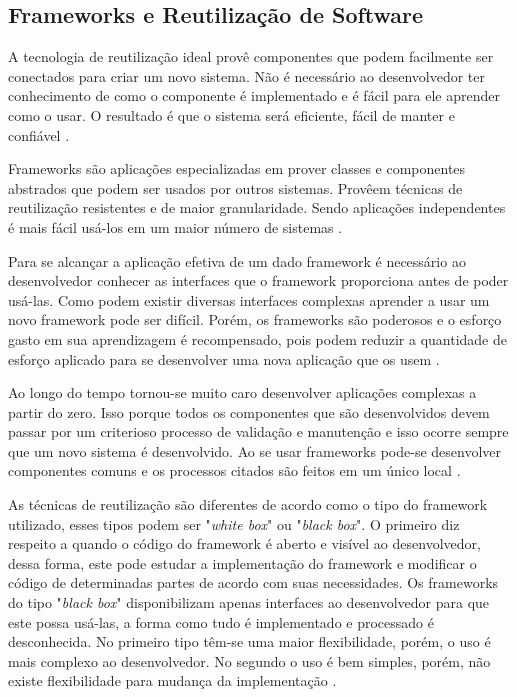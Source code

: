 \subsection{Frameworks e Reutilização de Software}

A tecnologia de reutilização ideal provê componentes que podem facilmente ser conectados para criar um novo sistema. Não é necessário ao desenvolvedor ter conhecimento de como o componente é implementado e é fácil para ele aprender como o usar. O resultado é que o sistema será eficiente, fácil de manter e confiável \cite{Johnson:1997}.

Frameworks são aplicações especializadas em prover classes e componentes abstrados que podem ser usados por outros sistemas. Provêem técnicas de reutilização resistentes e de maior granularidade. Sendo aplicações independentes é mais fácil usá-los em um maior número de sistemas \cite{Johnson:Foote:1988}.

Para se alcançar a aplicação efetiva de um dado framework é necessário ao desenvolvedor conhecer as interfaces que o framework proporciona antes de poder usá-las. Como podem existir diversas interfaces complexas aprender a usar um novo framework pode ser difícil. Porém, os frameworks são poderosos e o esforço gasto em sua aprendizagem é recompensado, pois podem reduzir a quantidade de esforço aplicado para se desenvolver uma nova aplicação que os usem \cite{Johnson:1997}.

Ao longo do tempo tornou-se muito caro desenvolver aplicações complexas a partir do zero. Isso porque todos os componentes que são desenvolvidos devem passar por um criterioso processo de validação e manutenção e isso ocorre sempre que um novo sistema é desenvolvido. Ao se usar frameworks pode-se desenvolver componentes comuns e os processos citados são feitos em um único local \cite{Fayad:Schimidt:1997}.

As técnicas de reutilização são diferentes de acordo como o tipo do framework utilizado, esses tipos podem ser "\textit{white box}" ou "\textit{black box}". O primeiro diz respeito a quando o código do framework é aberto e visível ao desenvolvedor, dessa forma, este pode estudar a implementação do framework e modificar o código de determinadas partes de acordo com suas necessidades. Os frameworks do tipo "\textit{black box}" disponibilizam apenas interfaces ao desenvolvedor para que este possa usá-las, a forma como tudo é implementado e processado é desconhecida. No primeiro tipo têm-se uma maior flexibilidade, porém, o uso é mais complexo ao desenvolvedor. No segundo o uso é bem simples, porém, não existe flexibilidade para mudança da implementação \cite{Kroth:2000}.

